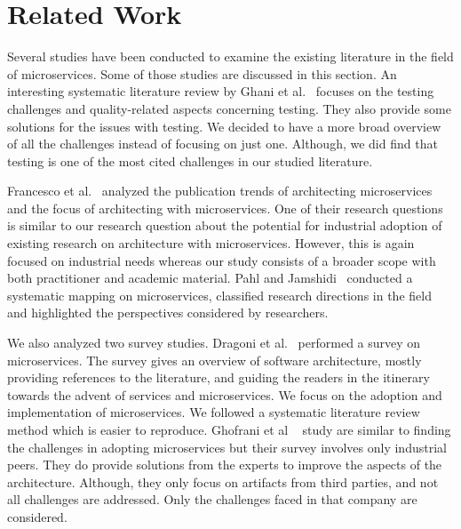 
\section{Related Work}\label{sec:related-work}

Several studies have been conducted to examine the existing literature in the field of microservices. Some of those studies are discussed in this section.
%
An interesting systematic literature review by Ghani et al.~\cite{Ghani2019} focuses on the testing challenges and quality-related aspects concerning testing. They also provide some solutions for the issues with testing. We decided to have a more broad overview of all the challenges instead of focusing on just one. Although, we did find that testing is one of the most cited challenges in our studied literature. 

Francesco et al.~\cite{Francesco2019} analyzed the publication trends of architecting microservices and the focus of architecting with microservices. One of their research questions is similar to our research question about the potential for industrial adoption of existing research on architecture with microservices. However, this is again focused on industrial needs whereas our study consists of a broader scope with both practitioner and academic material.
%
Pahl and Jamshidi~\cite{Claus2016} conducted a systematic mapping on microservices, classified research directions in the field and highlighted the perspectives considered by researchers.

We also analyzed two survey studies.
Dragoni et al.~\cite{Dragoni2017} performed a survey on microservices. The survey gives an overview of software architecture, mostly providing references to the literature, and guiding the readers in the itinerary towards the advent of services and microservices. We focus on the adoption and implementation of microservices. We followed a systematic literature review method which is easier to reproduce.
%
Ghofrani et al ~\cite{ghofrani2018} study are similar to finding the challenges in adopting microservices but their survey involves only industrial peers. They do provide solutions from the experts to improve the aspects of the architecture. Although, they only focus on artifacts from third parties, and not all challenges are addressed. Only the challenges faced in that company are considered.

